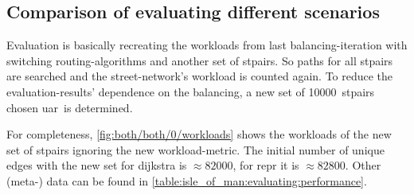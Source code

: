     \subsection{Comparison of evaluating different scenarios}

        Evaluation is basically recreating the workloads from last \gls{balancing}-iteration with switching routing-algorithms and another set of \glspl{stpair}.
        So paths for all \glspl{stpair} are searched and the street-network's workload is counted again.
        To reduce the evaluation-results' dependence on the \gls{balancing}, a new set of \num{10000}~\glspl{stpair} chosen \gls{uar}\ is determined.

        For completeness, \vref{fig:both/both/0/workloads} shows the workloads of the new set of \glspl{stpair} ignoring the new workload-\gls{metric}.
        The initial number of unique edges with the new set for \gls{dijkstra} is $\approx \num{82000}$, for \gls{repr} it is $\approx \num{82800}$.
        Other (meta-) data can be found in \vref{table:isle_of_man:evaluating:performance}.

